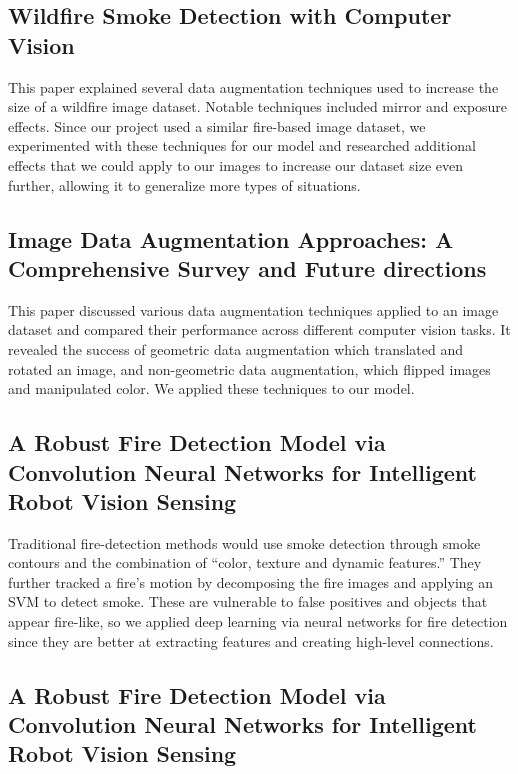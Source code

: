 \subsection{Wildfire Smoke Detection with Computer Vision
	~\citep{Daniel}}

This paper explained several data augmentation techniques used to increase the size of a wildfire image dataset. Notable techniques included mirror and exposure effects. Since our project used a similar fire-based image dataset, we experimented with these techniques for our model and researched additional effects that we could apply to our images to increase our dataset size even further, allowing it to generalize more types of situations.

\subsection{Image Data Augmentation Approaches: A Comprehensive Survey and Future directions~\citep{kumar2023image}}

This paper discussed various data augmentation techniques applied to an image dataset and compared their performance across different computer vision tasks. It revealed the success of geometric data augmentation which translated and rotated an image, and non-geometric data augmentation, which flipped images and manipulated color. We applied these techniques to our model.

\subsection{A Robust Fire Detection Model via Convolution Neural Networks for Intelligent Robot Vision Sensing~\citep{s22082929}}

Traditional fire-detection methods would use smoke detection through smoke contours and the combination of “color, texture and dynamic features.” They further tracked a fire’s motion by decomposing the fire images and applying an SVM to detect smoke.
These are vulnerable to false positives and objects that appear fire-like, so we applied deep learning via neural networks for fire detection since they are better at extracting features and creating high-level connections.

\subsection{A Robust Fire Detection Model via Convolution Neural Networks for Intelligent Robot Vision Sensing~\citep{howard2017mobilenets}}

